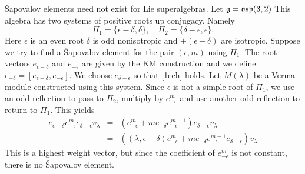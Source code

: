 \documentclass{article}
\newcommand{\ga}{\alpha}
\newcommand{\gd}{\delta}
\newcommand{\gl}{\lambda}
\newcommand{\gep}{\epsilon}
\newcommand{\fg}{\mathfrak{g}}\newcommand{\fgl}{\mathfrak{gl}}\newcommand{\so}{\mathfrak{so}}
\newcommand{\ey}{\end{eqnarray}}
\newcommand{\by}{\begin{eqnarray}}
\newcommand{\nn}{\nonumber}
\newcommand{\bexa}{\begin{example}}
\newcommand{\eexa}{\end{example}}
\begin{document}
\bexa \label{2.5}{\rm \v Sapovalov elements need not exist for Lie superalgebras.  Let $\fg=\osp(3,2)$ This algebra has two systems of positive roots up conjugacy.  Namely
$$ \Pi_1 = \{\gep-\gd, \gd \}, \quad \Pi_2 = \{\gd-\gep, \gep \}.$$
Here  $\gep$ is an even root $\gd$ is odd nonisotropic and $\pm (\gep-\gd)$ are isotropic. Suppose we try to find a \v Sapovalov element for the pair $(\gep,m)$ using $\Pi_1$.  The root vectors $
e_{\gep-\gd}$ and $e_{-\gep}$ are given by the KM construction and we define $e_{-\gd}= [e_{\gep-\gd}, e_{-\gep}]$.  We choose $e_{\gd-\gep}$ so that \eqref{1eeh} holds. 
Let $M(\gl)$ be a Verma module constructed using this system. Since $\gep$ is not a simple root of $\Pi_1$,  we use an odd reflection to pass to  $\Pi_2$, multiply by  $ e_{-\gep}^m$ and use another odd reflection to return to  $\Pi_1$. This yields  
\by e_{\gep-\gd} e_{-\gep}^m e_{\gd-\gep}v_\gl &=& ( e_{-\gep}^m + me_{-\gd} e_{-\gep}^{m-1})e_{\gd-\gep}v_\gl\nn\\
&=& ((\gl,{\gep-\gd}) e_{-\gep}^m  + me_{-\gd} e_{-\gep}^{m-1}e_{\gd-\gep})v_\gl\nn \ey This is a highest weight vector, but since the coefficient of $ e_{-\gep}^m$ is not constant, there is no  \v Sapovalov element.
}\eexa
\end{document}
